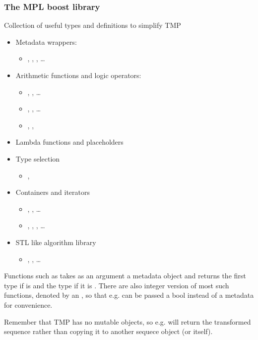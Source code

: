 \documentclass[11pt,a4paper,dvipsnames,usenames]{beamer}
\begin{document}
\begin{frame}[fragile]
  \frametitle{The MPL boost library}

  Collection of useful types and definitions to simplify TMP

  \begin{itemize}
    \item<1-> Metadata wrappers:
      \begin{itemize}
        \item {}, , , \dots
      \end{itemize}
    \item<1-> Arithmetic functions and logic operators:
      \begin{itemize}
        \item {}, , \dots
        \item {}, , \dots
        \item {}, , 
      \end{itemize}
    \item<2-> Lambda functions and placeholders
    \item<3-> Type selection
      \begin{itemize}
        \item {}, 
      \end{itemize}
    \item<4-> Containers and iterators
      \begin{itemize}
        \item {}, , \dots
        \item {}, , , \dots
      \end{itemize}
    \item<4-> STL like algorithm library
      \begin{itemize}
        \item {}, , \dots
      \end{itemize}
  \end{itemize}

  {
    Functions such as  takes as an argument a metadata object and returns the first
    type  if  is  and the type  if it is
    . There are also integer version of most such functions, denoted by an , so that e.g.
     can be passed a bool instead of a metadata for convenience.

    \vspace{1em}

    Remember that TMP has no mutable objects, so e.g.  will return the transformed sequence rather
    than copying it to another sequece object (or itself).
  }
\end{frame}
\end{document}

